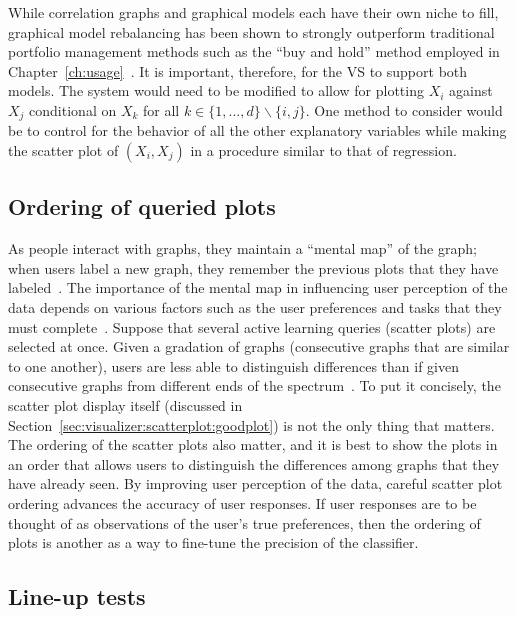 While correlation graphs and graphical models each have their own niche to 
fill, graphical model rebalancing has been shown to strongly outperform 
traditional portfolio management methods such as the ``buy and hold'' method 
employed in Chapter~\ref{ch:usage}~\cite{liuh2016}. 
It is important, therefore, for the VS to 
support both models. The system would need to be modified to allow for plotting 
$X_i$ against $X_j$ conditional on $X_k$ for all $k\in\{1,...,d\} \backslash 
\{i,j\}$. One method to consider would be to control for the behavior of all 
the other explanatory variables while making the scatter plot of $(X_i,X_j)$ in 
a procedure similar to that of regression.

\subsection{Ordering of queried plots}
\label{sec:futurework:ordering}

As people interact with graphs, they maintain a ``mental map'' of the 
graph; when users label a new graph, they remember the previous plots that they
have labeled~\cite{federico2016}. The importance of the mental map in 
influencing user perception of the data depends on
various factors such as the user preferences and tasks that they must
complete~\cite{federico2016}. Suppose that several active learning queries 
(scatter plots) are selected at once. Given a gradation of graphs (consecutive
graphs that are similar to one another), users are less able to 
distinguish differences than if given consecutive graphs from different 
ends of the spectrum~\cite{federico2016}. To put it 
concisely, the scatter plot display itself (discussed in 
Section~\ref{sec:visualizer:scatterplot:goodplot}) is not the only thing that 
matters. The ordering of the scatter plots also matter, and it is best to show 
the plots in an order that allows users to distinguish the differences among 
graphs that they have already seen. By improving user perception of the data, 
careful scatter plot ordering advances the accuracy of user responses. If user 
responses are to be thought of as observations of the user's true preferences, 
then the ordering of plots is another as a way to fine-tune the precision of 
the classifier. 

\subsection{Line-up tests}
\label{sec:futurework:lineup}

